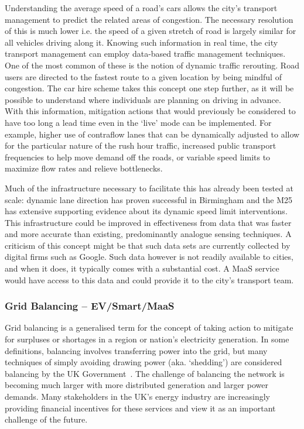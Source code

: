 \documentclass[journal]{IEEEtran}
\begin{document}
Understanding the average speed of a road's cars allows the city's
transport management to predict the related areas of congestion. The
necessary resolution of this is much lower i.e. the speed of a given
stretch of road is largely similar for all vehicles driving along
it. Knowing such information in real time, the city transport
management can employ data-based traffic management techniques. One of
the most common of these is the notion of dynamic traffic
rerouting. Road users are directed to the fastest route to a given
location by being mindful of congestion. The car hire scheme takes
this concept one step further, as it will be possible to understand
where individuals are planning on driving in advance. With this
information, mitigation actions that would previously be considered to
have too long a lead time even in the `live' mode can be
implemented. For example, higher use of contraflow lanes that can be
dynamically adjusted to allow for the particular nature of the rush
hour traffic, increased public transport frequencies to help move
demand off the roads, or variable speed limits to maximize flow rates
and relieve bottlenecks.

Much of the infrastructure necessary to facilitate this has already
been tested at scale: dynamic lane direction has proven successful in
Birmingham and the M25 has extensive supporting evidence about its
dynamic speed limit interventions. This infrastructure could be
improved in effectiveness from data that was faster and more accurate
than existing, predominantly analogue sensing techniques.  A criticism
of this concept might be that such data sets are currently collected
by digital firms such as Google. Such data however is not readily
available to cities, and when it does, it typically comes with a
substantial cost. A MaaS service would have access to this data
and could provide it to the city's transport team.


\subsubsection{Grid Balancing -- EV/Smart/MaaS} 

Grid balancing is a generalised term for the concept of taking action
to mitigate for surpluses or shortages in a region or nation’s
electricity generation. In some definitions, balancing involves
transferring power into the grid, but many techniques of simply
avoiding drawing power (aka. `shedding') are considered balancing by
the UK Government~\cite{decc:2014}. The challenge of balancing the
network is becoming much larger with more distributed generation and
larger power demands. Many stakeholders in the UK's energy industry
are increasingly providing financial incentives for these services and
view it as an important challenge of the future.
\end{document}
